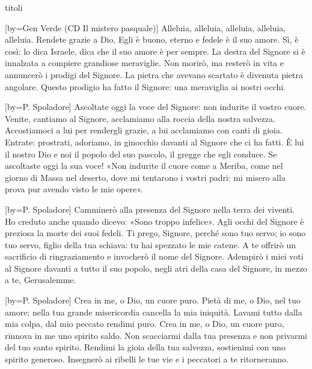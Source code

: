 \begin{songs}{titoli}

[by={Gen Verde (CD Il mistero pasquale)}]
\beginchorus
Alleluia, alleluia, alleluia,
alleluia, alleluia. 
\endchorus
\beginverse
Rendete grazie a Dio, Egli è buono,
eterno e fedele è il suo amore.
Sì, è così: lo dica Israele,
dica che il suo amore è per sempre.
\endverse
\beginverse
La destra del Signore si è innalzata
a compiere grandiose meraviglie.
Non morirò, ma resterò in vita
e annuncerò i prodigi del Signore.
\endverse
\beginverse
La pietra che avevano scartato
è divenuta pietra angolare.
Questo prodigio ha fatto il Signore:
una meraviglia ai nostri occhi.
\endverse
\endsong

[by={P. Spoladore}]
\beginchorus
Ascoltate oggi la voce del Signore:
non indurite il vostro cuore.
\endchorus
\beginverse
Venite, cantiamo al Signore,
acclamiamo alla roccia della nostra salvezza.
Accostiamoci a lui per rendergli grazie,
a lui acclamiamo con canti di gioia.
\endverse
\beginverse
Entrate: prostrati, adoriamo,
in ginocchio davanti al Signore che ci ha fatti.
È lui il nostro Dio e noi il popolo del suo pascolo,
il gregge che egli conduce.
\endverse
\beginverse
Se ascoltaste oggi la sua voce!
«Non indurite il cuore come a Meriba,
come nel giorno di Massa nel deserto,
dove mi tentarono i vostri padri:
mi misero alla prova pur avendo visto le mie opere».
\endverse
\endsong

[by={P. Spoladore}]
\beginchorus
Camminerò alla presenza del Signore
nella terra dei viventi.
\endchorus
\beginverse
Ho creduto anche quando dicevo:
«Sono troppo infelice».
Agli occhi del Signore è preziosa
la morte dei suoi fedeli.
\endverse
\beginverse
Ti prego, Signore, perché sono tuo servo;
io sono tuo servo, figlio della tua schiava:
tu hai spezzato le mie catene.
A te offrirò un sacrificio di ringraziamento
e invocherò il nome del Signore.
\endverse
\beginverse
Adempirò i miei voti al Signore
davanti a tutto il suo popolo,
negli atri della casa del Signore,
in mezzo a te, Gerusalemme.
\endverse
\endsong

[by={P. Spoladore}]
\beginchorus
Crea in me, o Dio, un cuore puro. 
\endchorus
\beginverse
Pietà di me, o Dio, nel tuo amore; nella tua grande misericordia
cancella la mia iniquità.
Lavami tutto dalla mia colpa,
dal mio peccato rendimi puro.
\endverse
\beginverse
Crea in me, o Dio, un cuore puro,
rinnova in me uno spirito saldo.
Non scacciarmi dalla tua presenza
e non privarmi del tuo santo spirito.
\endverse
\beginverse
Rendimi la gioia della tua salvezza,
sostienimi con uno spirito generoso.
Insegnerò ai ribelli le tue vie
e i peccatori a te ritorneranno.
\endverse
\endsong


\end{songs}
